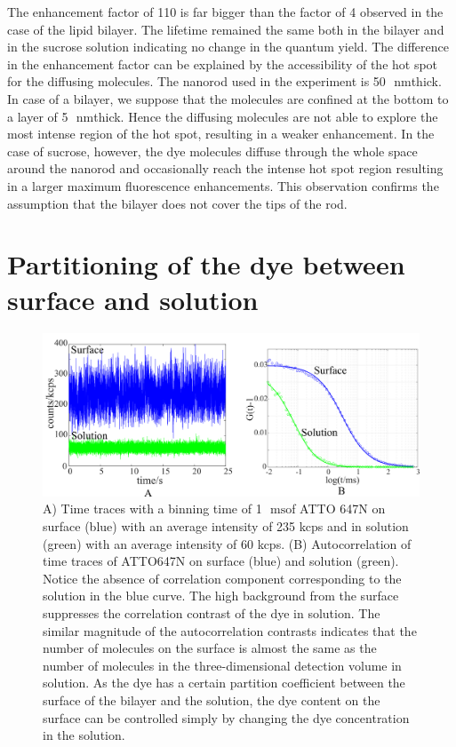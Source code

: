 \documentclass[11pt,a4paper,onecolumn]{article}
\newcommand{\nm}{\ensuremath{\,\textrm{nm}}}
\newcommand{\ms}{\ensuremath{\,\textrm{ms}}}
\begin{document}
The enhancement factor of 110 is far bigger than the factor of 4 observed in the case of the lipid bilayer. The lifetime remained the same both in the bilayer and in the sucrose solution indicating no change in the quantum yield. The difference in the enhancement factor can be explained by the accessibility of the hot spot for the diffusing molecules. The nanorod used in the experiment is 50~\nm thick. In case of a bilayer, we suppose that the molecules are confined at the bottom to a layer of 5~\nm thick. Hence the diffusing molecules are not able to explore the most intense region of the hot spot, resulting in a weaker enhancement. In the case of sucrose, however, the dye molecules diffuse through the whole space around the nanorod and occasionally reach the intense hot spot region resulting in a larger maximum fluorescence enhancements. This observation confirms the assumption that the bilayer does not cover the tips of the rod.\\
\newpage
\section{Partitioning of the dye between surface and solution}
\begin{figure}[ht]
  \centering
  \includegraphics[width=\textwidth]{surf_soln.png}
  \makeatletter
  \renewcommand{\fnum@figure}{\figurename~S\thefigure}
  \makeatother{}
  \caption{A) Time traces with a binning time of 1~\ms of ATTO 647N on surface (blue) with an average intensity of 235 kcps and in solution (green) with an average intensity of 60 kcps. (B) Autocorrelation of time traces of ATTO647N on surface (blue) and solution (green). Notice the absence of correlation component corresponding to the solution in the blue curve. The high background from the surface suppresses the correlation contrast of the dye in solution. The similar magnitude of the autocorrelation contrasts indicates that the number of molecules on the surface is almost the same as the number of molecules in the three-dimensional detection volume in solution. As the dye has a certain partition coefficient between the surface of the bilayer and the solution, the dye content on the surface can be controlled simply by changing the dye concentration in the solution.}
  \label{SIfig:surf-soln}
\end{figure}

\pagebreak

\end{document}
